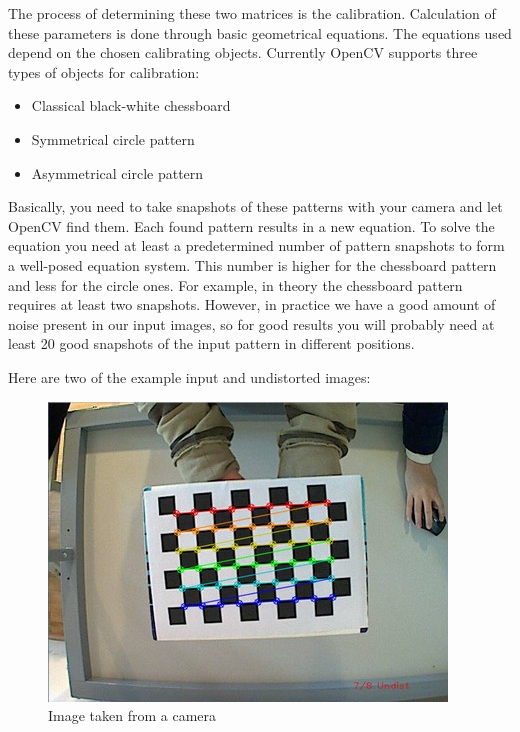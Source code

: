 \documentclass[11pt]{report}
\begin{document}
The process of determining these two matrices is the calibration. Calculation of these parameters is done through basic geometrical equations. The equations used depend on the chosen calibrating objects. Currently OpenCV supports three types of objects for calibration:

\begin{itemize}
 \item Classical black-white chessboard
 \item Symmetrical circle pattern
 \item Asymmetrical circle pattern
\end{itemize}

Basically, you need to take snapshots of these patterns with your camera and let OpenCV find them. Each found pattern results in a new equation. To solve the equation you need at least a predetermined number of pattern snapshots to form a well-posed equation system. This number is higher for the chessboard pattern and less for the circle ones. For example, in theory the chessboard pattern requires at least two snapshots. However, in practice we have a good amount of noise present in our input images, so for good results you will probably need at least 20 good snapshots of the input pattern in different positions.

Here are two of the example input and undistorted images:



\begin{figure}
[hp]
\centering
\includegraphics[scale=0.5]{normal.jpg}
\caption[Normal Image]{Image taken from a camera}
\end{figure}
\end{document}
